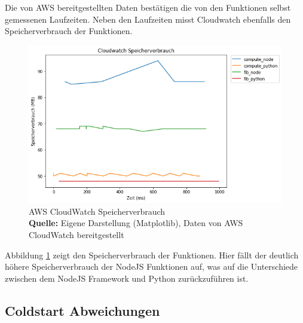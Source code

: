 \documentclass[12pt,a4paper,parskip=half]{scrreprt}
\newcommand*{\captionsource}[2]{%
	\caption[{#1}]{%
		#1%
		\\\hspace{\linewidth}%
		\textbf{Quelle:} #2%
	}%
}
\begin{document}
Die von AWS bereitgestellten Daten bestätigen die von den Funktionen selbst gemessenen Laufzeiten. Neben den Laufzeiten misst Cloudwatch ebenfalls den Speicherverbrauch der Funktionen.

\FloatBarrier
\begin{figure}[h!]
	\centering
	\includegraphics[scale=0.7]{aw_c_cloudwatch_ram}
	\captionsource{AWS CloudWatch Speicherverbrauch}
	{Eigene Darstellung (Matplotlib), Daten von AWS CloudWatch bereitgestellt}
	\label{aw_c_cloudwatch_ram}
\end{figure}
\FloatBarrier

Abbildung \ref{aw_c_cloudwatch_ram} zeigt den Speicherverbrauch der Funktionen. Hier fällt der deutlich höhere Speicherverbrauch der NodeJS Funktionen auf, was auf die Unterschiede zwischen dem NodeJS Framework und Python zurückzuführen ist.  

\newpage
\subsection{Coldstart Abweichungen}
\end{document}
